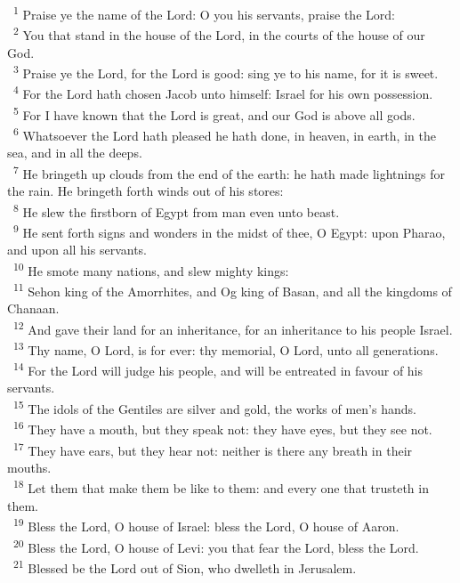 \documentclass[a5paper,12pt]{article}
\begin{document}
\begin{multicols*}{2}
~\textsuperscript{1} Praise ye the name of the Lord: O you his servants, praise the Lord:\\
~\textsuperscript{2} You that stand in the house of the Lord, in the courts of the house of our God.\\
~\textsuperscript{3} Praise ye the Lord, for the Lord is good: sing ye to his name, for it is sweet.\\
~\textsuperscript{4} For the Lord hath chosen Jacob unto himself: Israel for his own possession.\\
~\textsuperscript{5} For I have known that the Lord is great, and our God is above all gods.\\
~\textsuperscript{6} Whatsoever the Lord hath pleased he hath done, in heaven, in earth, in the sea, and in all the deeps.\\
~\textsuperscript{7} He bringeth up clouds from the end of the earth: he hath made lightnings for the rain. He bringeth forth winds out of his stores:\\
~\textsuperscript{8} He slew the firstborn of Egypt from man even unto beast.\\
~\textsuperscript{9} He sent forth signs and wonders in the midst of thee, O Egypt: upon Pharao, and upon all his servants.\\
~\textsuperscript{10} He smote many nations, and slew mighty kings:\\
~\textsuperscript{11} Sehon king of the Amorrhites, and Og king of Basan, and all the kingdoms of Chanaan.\\
~\textsuperscript{12} And gave their land for an inheritance, for an inheritance to his people Israel.\\
~\textsuperscript{13} Thy name, O Lord, is for ever: thy memorial, O Lord, unto all generations.\\
~\textsuperscript{14} For the Lord will judge his people, and will be entreated in favour of his servants.\\
~\textsuperscript{15} The idols of the Gentiles are silver and gold, the works of men's hands.\\
~\textsuperscript{16} They have a mouth, but they speak not: they have eyes, but they see not.\\
~\textsuperscript{17} They have ears, but they hear not: neither is there any breath in their mouths.\\
~\textsuperscript{18} Let them that make them be like to them: and every one that trusteth in them.\\
~\textsuperscript{19} Bless the Lord, O house of Israel: bless the Lord, O house of Aaron.\\
~\textsuperscript{20} Bless the Lord, O house of Levi: you that fear the Lord, bless the Lord.\\
~\textsuperscript{21} Blessed be the Lord out of Sion, who dwelleth in Jerusalem.\\


\end{multicols*}
\end{document}
